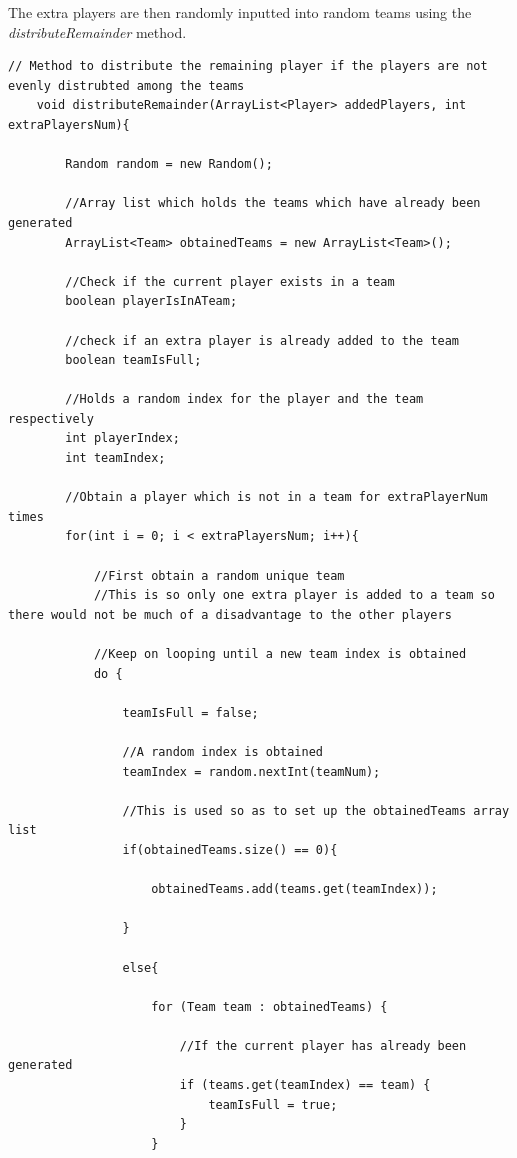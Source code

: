 \documentclass[a4paper,12pt]{extarticle}
\begin{document}
\noindent The extra players are then randomly inputted into random teams using the \textit{distributeRemainder} method.

\begin{lstlisting}
// Method to distribute the remaining player if the players are not evenly distrubted among the teams
    void distributeRemainder(ArrayList<Player> addedPlayers, int extraPlayersNum){

        Random random = new Random();

        //Array list which holds the teams which have already been generated
        ArrayList<Team> obtainedTeams = new ArrayList<Team>();

        //Check if the current player exists in a team
        boolean playerIsInATeam;

        //check if an extra player is already added to the team
        boolean teamIsFull;

        //Holds a random index for the player and the team respectively
        int playerIndex;
        int teamIndex;

        //Obtain a player which is not in a team for extraPlayerNum times
        for(int i = 0; i < extraPlayersNum; i++){

            //First obtain a random unique team
            //This is so only one extra player is added to a team so there would not be much of a disadvantage to the other players

            //Keep on looping until a new team index is obtained
            do {

                teamIsFull = false;

                //A random index is obtained
                teamIndex = random.nextInt(teamNum);

                //This is used so as to set up the obtainedTeams array list
                if(obtainedTeams.size() == 0){

                    obtainedTeams.add(teams.get(teamIndex));

                }

                else{

                    for (Team team : obtainedTeams) {

                        //If the current player has already been generated
                        if (teams.get(teamIndex) == team) {
                            teamIsFull = true;
                        }
                    }


\end{lstlisting}
\end{document}
